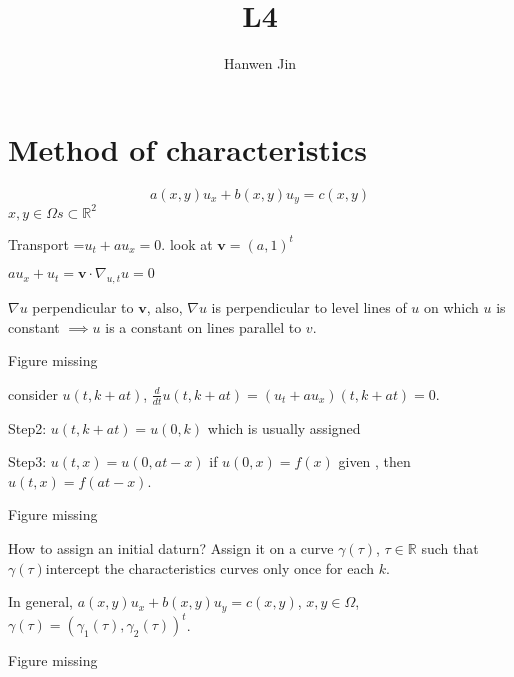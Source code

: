 \documentclass[a4paper]{article}
\title{L4}
\author{Hanwen Jin}
\theoremstyle{definition}
\begin{document}
	\maketitle
	\section{Method of characteristics}
	\begin{equation}
		a\left( x,y \right) u_x+b\left( x,y \right) u_y=c(x,y)
	\end{equation} 	
	$x,y\in \Omega s\subset \mathbb{R}^2$ 

	Transport =$u_t+au_x=0$. look at $\mathbf{v}=\left( a,1 \right) ^{t}$

	$au_x+u_t=\mathbf{v}\cdot\nabla _{u,t}u=0$

	$\nabla u$ perpendicular to $\mathbf{v}$, also, $\nabla u$ is perpendicular to level lines of $u$ on which $u$ is constant $\implies u$ is a constant on lines parallel to $v$. 

	Figure missing

	consider $u(t,k+at)$, $\frac{d}{dt}u(t,k+at)=(u_t+au_x)(t,k+at)=0$. 

	Step2: $u(t,k+at)=u(0,k)$ which is usually assigned

	Step3: $u(t,x)=u(0,at-x)$ if $u\left( 0,x \right) =f\left( x \right) $ given , then $u\left( t,x \right) =f\left( at-x \right) $. 

	Figure missing

	How to assign an initial daturn? Assign it on a curve $\gamma\left( \tau \right) $, $\tau\in \mathbb{R}$ such that $\gamma\left( \tau \right) $intercept the characteristics curves only once for each $k$. 
	
	In general, $a(x,y)u_x+b(x,y)u_y=c(x,y)$, $x,y\in \Omega$, $\gamma\left( \tau \right) =\left( \gamma_1\left( \tau \right) ,\gamma_2\left( \tau \right)  \right) ^{t}$. 

	Figure missing
\end{document}
